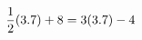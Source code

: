 \documentclass[preview]{standalone}
\begin{document}
\begin{align*}
\special{dvisvgm:raw <g id='unique000'>}\frac{1}{2} (3.7) + 8 = 3(3.7) - 4\special{dvisvgm:raw </g>}
\end{align*}
\end{document}
